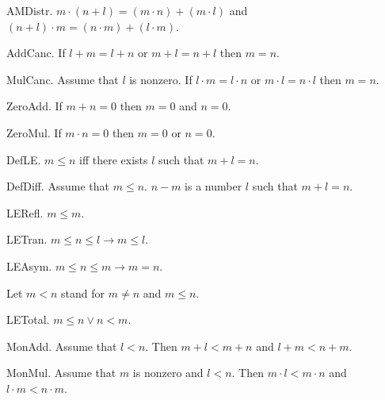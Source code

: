 \begin{axiom} AMDistr.  
$m \cdot (n + l) = (m \cdot n) + (m \cdot l)$ and
$(n + l) \cdot m = (n \cdot m) + (l \cdot m)$.\end{axiom}

\begin{axiom} AddCanc.  
If $l + m = l + n$ or $m + l = n + l$ then $m = n$.\end{axiom}

\begin{axiom} MulCanc.
Assume that $l$ is nonzero. If 
$l \cdot m = l \cdot n$ or $m \cdot l = n \cdot l$ 
then $m = n$.\end{axiom}

\begin{axiom} ZeroAdd.
If $m + n = 0$ then $m = 0$ and $n = 0$.\end{axiom}

\begin{lemma} ZeroMul.
If $m \cdot n = 0$ then $m = 0$ or $n = 0$.
\end{lemma}

\begin{definition} DefLE.
$m \leq n$ iff there exists $l$ such that $m + l = n$.
\end{definition}

\begin{definition} DefDiff.  Assume that $m \leq n$.
$n - m$ is a number $l$ such that $m + l = n$.
\end{definition}

\begin{lemma} LERefl. $m \leq m$. \end{lemma}
\begin{lemma} LETran. $m \leq n \leq l  \rightarrow  m \leq l$.
\end{lemma}
\begin{lemma} LEAsym. $m \leq n \leq m  \rightarrow  m = n$. 
\end{lemma}

Let $m < n$ stand for $m \neq n$ and $m \leq n$.

\begin{axiom} LETotal. $m \leq n \vee n < m$. \end{axiom}

\begin{lemma} MonAdd. Assume that $l < n$.
Then $m + l < m + n$ and $l + m < n + m$.
\end{lemma}

\begin{lemma} MonMul. Assume that $m$ is nonzero and $l < n$.
Then $m \cdot l < m \cdot n$ and $l \cdot m < n \cdot m$.
\end{lemma}

